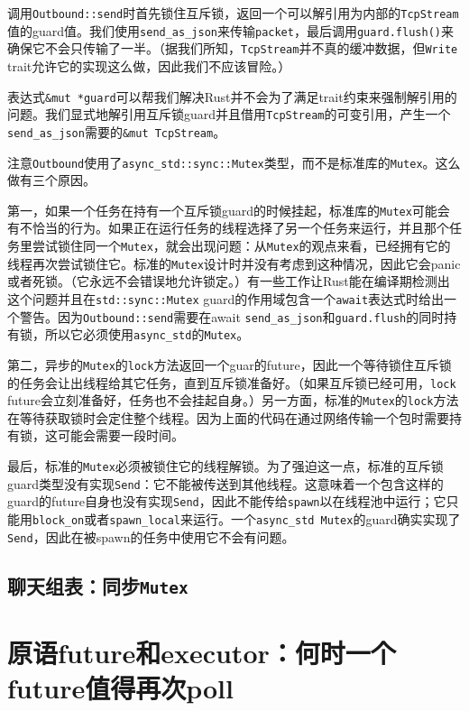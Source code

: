 调用\texttt{Outbound::send}时首先锁住互斥锁，返回一个可以解引用为内部的\texttt{TcpStream}值的guard值。我们使用\texttt{send\_as\_json}来传输\texttt{packet}，最后调用\texttt{guard.flush()}来确保它不会只传输了一半。（据我们所知，\texttt{TcpStream}并不真的缓冲数据，但\texttt{Write} trait允许它的实现这么做，因此我们不应该冒险。）

表达式\texttt{\&mut *guard}可以帮我们解决Rust并不会为了满足trait约束来强制解引用的问题。我们显式地解引用互斥锁guard并且借用\texttt{TcpStream}的可变引用，产生一个\texttt{send\_as\_json}需要的\texttt{\&mut TcpStream}。

注意\texttt{Outbound}使用了\texttt{async\_std::sync::Mutex}类型，而不是标准库的\texttt{Mutex}。这么做有三个原因。

第一，如果一个任务在持有一个互斥锁guard的时候挂起，标准库的\texttt{Mutex}可能会有不恰当的行为。如果正在运行任务的线程选择了另一个任务来运行，并且那个任务里尝试锁住同一个\texttt{Mutex}，就会出现问题：从\texttt{Mutex}的观点来看，已经拥有它的线程再次尝试锁住它。标准的\texttt{Mutex}设计时并没有考虑到这种情况，因此它会panic或者死锁。（它永远不会错误地允许锁定。）有一些工作让Rust能在编译期检测出这个问题并且在\texttt{std::sync::Mutex} guard的作用域包含一个\texttt{await}表达式时给出一个警告。因为\texttt{Outbound::send}需要在await \texttt{send\_as\_json}和\texttt{guard.flush}的同时持有锁，所以它必须使用\texttt{async\_std}的\texttt{Mutex}。

第二，异步的\texttt{Mutex}的\texttt{lock}方法返回一个guar的future，因此一个等待锁住互斥锁的任务会让出线程给其它任务，直到互斥锁准备好。（如果互斥锁已经可用，\texttt{lock} future会立刻准备好，任务也不会挂起自身。）另一方面，标准的\texttt{Mutex}的\texttt{lock}方法在等待获取锁时会定住整个线程。因为上面的代码在通过网络传输一个包时需要持有锁，这可能会需要一段时间。

最后，标准的\texttt{Mutex}必须被锁住它的线程解锁。为了强迫这一点，标准的互斥锁guard类型没有实现\texttt{Send}：它不能被传送到其他线程。这意味着一个包含这样的guard的future自身也没有实现\texttt{Send}，因此不能传给\texttt{spawn}以在线程池中运行；它只能用\texttt{block\_on}或者\texttt{spawn\_local}来运行。一个\texttt{async\_std Mutex}的guard确实实现了\texttt{Send}，因此在被spawn的任务中使用它不会有问题。

\subsection{聊天组表：同步\texttt{Mutex}}

\section{原语future和executor：何时一个future值得再次poll}\label{WhenPoll}

